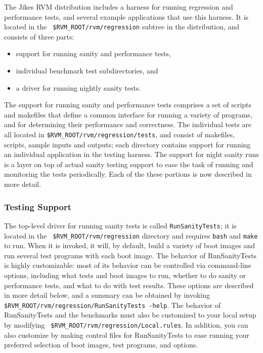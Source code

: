  The Jikes\TMweb{} RVM distribution includes a harness for running
regression and performance tests, and several example applications
that use this harness.  It is located in the {\tt
\$RVM\_ROOT/rvm/regression} subtree in the distribution, and consists
of three parts:
\begin{itemize}
\item support for running sanity and performance tests, 
\item individual benchmark test subdirectories, and 
\item a driver for running nightly sanity tests.  
\end{itemize}
The support for running
sanity and performance tests comprises a set of scripts and makefiles
that define a common interface for running a variety of programs, and
for determining their performance and correctness.  The individual
tests are all located in {\tt{\$RVM\_ROOT/rvm/regression/tests}}, and
consist of makefiles, scripts, sample inputs and outputs; each
directory contains support for running an individual application in
the testing harness.  The support for night sanity runs is a layer on
top of actual sanity testing support to ease the task of running and
monitoring the tests periodically.  Each of the these portions is now
described in more detail.

\subsubsection{Testing Support}

The top-level driver for running sanity tests is called
{\tt{RunSanityTests}}; it is located in the {\tt
\$RVM\_ROOT/rvm/regression} directory 
and requires {\tt{bash}} and {{\tt make}} to run.  When it
is invoked, it will, by default, build a variety of boot images and
run several test programs with each boot image.  The behavior of
RunSanityTests is highly customizable: most of its behavior can be
controlled via command-line options, including what tests and boot
images to run, whether to do sanity or performance tests, and what to
do with test results. These options are described in more detail
below, and a summary can be obtained by invoking {\tt
\$RVM\_ROOT/rvm/regression/RunSanityTests -help}.  The behavior of
RunSanityTests and the benchmarks must also be customized to your
local setup by modifying {\tt
\$RVM\_ROOT/rvm/regression/Local.rules}.  In addition, you can also
customize by making control files for RunSanityTests to ease running
your preferred selection of boot images, test programs, and options.

